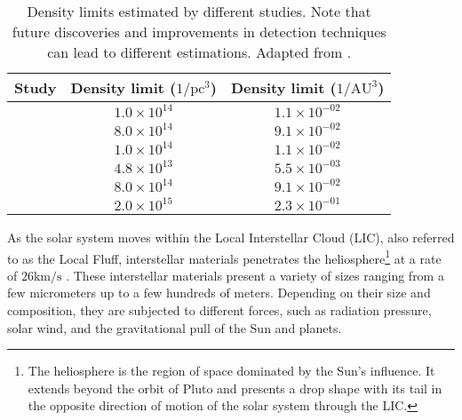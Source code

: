 
\begin{table}[H]
    \centering
    \begin{tabular}{|c|c|c|}
        \hline
        \textbf{Study} & \textbf{Density limit ($1/\text{pc}^3$)} & \textbf{Density limit ($1/\text{AU}^3$)} \\
        \hline
        \cite{gaidos2017} & $1.0 \times 10^{14}$ & $1.1 \times 10^{-02}$ \\
        \cite{jewitt2017} & $8.0 \times 10^{14}$ & $9.1 \times 10^{-02}$ \\
        \cite{portegies2018} & $1.0 \times 10^{14}$ & $1.1 \times 10^{-02}$ \\
        \cite{feng2018} & $4.8 \times 10^{13}$ & $5.5 \times 10^{-03}$ \\
        \cite{fraser2018} & $8.0 \times 10^{14}$ & $9.1 \times 10^{-02}$ \\
        \cite{do2018} & $2.0 \times 10^{15}$ & $2.3 \times 10^{-01}$ \\
        \hline
    \end{tabular}
    \caption{Density limits estimated by different studies. Note that future
    discoveries and improvements in detection techniques can lead to different
    estimations. Adapted from \cite{moro2023}.}
    \label{tab:iso_density_limits}
\end{table}











As the solar system moves within the Local Interstellar Cloud (LIC), also
referred to as the Local Fluff, interstellar materials penetrates the
heliosphere\footnote{The heliosphere is the region of space dominated by the
Sun's influence. It extends beyond the orbit of Pluto and presents a drop shape
with its tail in the opposite direction of motion of the solar system through
the LIC.} at a rate of $26\text{km/s}$ \cite{hajdukova2020}. These interstellar
materials present a variety of sizes ranging from a few micrometers up to a few
hundreds of meters. Depending on their size and composition, they are subjected
to different forces, such as radiation pressure, solar wind, and the
gravitational pull of the Sun and planets.

